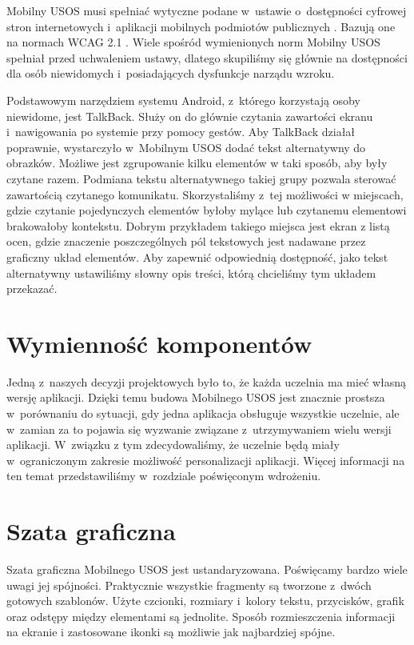 \documentclass{pracamgr}
\begin{document}
Mobilny USOS musi spełniać wytyczne podane w~ustawie o~dostępności cyfrowej stron
internetowych i~aplikacji mobilnych podmiotów publicznych \cite{uodc}. Bazują one
na normach WCAG 2.1 \cite{wcag21}. Wiele spośród wymienionych norm Mobilny USOS
spełniał przed uchwaleniem ustawy, dlatego skupiliśmy się głównie na dostępności
dla osób niewidomych i~posiadających dysfunkcje narządu wzroku.

Podstawowym narzędziem systemu Android, z~którego korzystają osoby niewidome, jest
TalkBack. Służy on do głównie czytania zawartości ekranu i~nawigowania po systemie
przy pomocy gestów. Aby TalkBack działał poprawnie, wystarczyło w~Mobilnym USOS
dodać tekst alternatywny do obrazków. Możliwe jest zgrupowanie kilku elementów w
taki sposób, aby były czytane razem. Podmiana tekstu alternatywnego takiej grupy
pozwala sterować zawartością czytanego komunikatu. Skorzystaliśmy z~tej możliwości
w miejscach, gdzie czytanie pojedynczych elementów byłoby mylące lub czytanemu
elementowi brakowałoby kontekstu. Dobrym przykładem takiego miejsca jest ekran z
listą ocen, gdzie znaczenie poszczególnych pól tekstowych jest nadawane przez
graficzny układ elementów. Aby zapewnić odpowiednią dostępność, jako tekst alternatywny
ustawiliśmy słowny opis treści, którą chcieliśmy tym układem przekazać.

\section{Wymienność komponentów}

Jedną z~naszych decyzji projektowych było to, że każda uczelnia ma mieć własną
wersję aplikacji. Dzięki temu budowa Mobilnego USOS jest znacznie prostsza w~porównaniu
do sytuacji, gdy jedna aplikacja obsługuje wszystkie uczelnie, ale w~zamian za to
pojawia się wyzwanie związane z~utrzymywaniem wielu wersji aplikacji. W~związku z
tym zdecydowaliśmy, że uczelnie będą miały w~ograniczonym zakresie możliwość
personalizacji aplikacji. Więcej informacji na ten temat przedstawiliśmy w~rozdziale
poświęconym wdrożeniu.

\section{Szata graficzna}

Szata graficzna Mobilnego USOS jest ustandaryzowana. Poświęcamy bardzo wiele
uwagi jej spójności. Praktycznie wszystkie fragmenty są tworzone z~dwóch gotowych
szablonów. Użyte czcionki, rozmiary i~kolory tekstu, przycisków, grafik oraz odstępy
między elementami są jednolite. Sposób rozmieszczenia informacji na ekranie i
zastosowane ikonki są możliwie jak najbardziej spójne.
\end{document}
